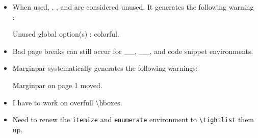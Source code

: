 \documentclass[
	raggedright,
	twoside,
	12pt,
	colorful,
]{tufte-style-article}
\begin{document}
\begin{itemize}\tightlist
\item When used, , , and  are considered unused. It generates the following warning :
\begin{codebox}{}
Unused global option(s) : colorful.
\end{codebox}
\item Bad page breaks can still occur for _\textfig{}_, _\widefig{}_, and code snippet environments.
\item Marginpar systematically generates the following warnings:
\begin{codebox}{}
Marginpar on page 1 moved.
\end{codebox}
\item I have to work on overfull \textbackslash hboxes.
\item Need to renew the \texttt{itemize} and \texttt{enumerate} environment to \texttt{\textbackslash tightlist} them up.
\end{itemize}
\end{document}
